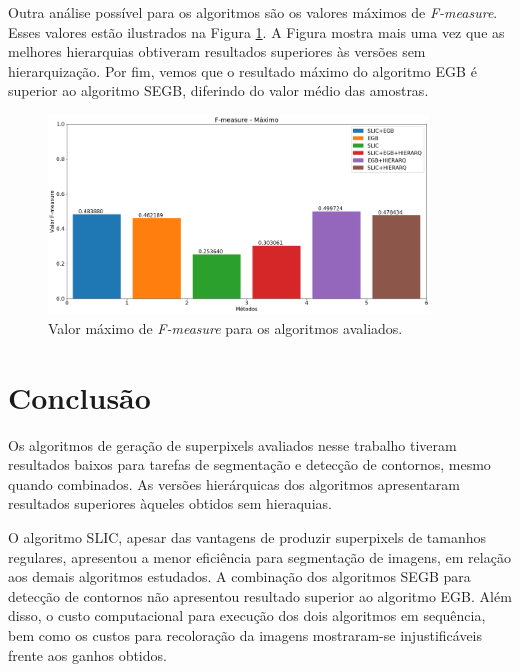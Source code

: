 \begin{document}
Outra análise possível para os algoritmos são os valores máximos de \textit{F-measure}. Esses valores estão ilustrados na Figura \ref{fig:FMEASURE_MAX}. A Figura mostra mais uma vez que as melhores hierarquias obtiveram resultados superiores às versões sem hierarquização. Por fim, vemos que o resultado máximo do algoritmo EGB é superior ao algoritmo SEGB, diferindo do valor médio das amostras.

\begin{figure}[ht]
\centering
\includegraphics[width=0.9\textwidth]{fmeasure_max.png}
\caption{Valor máximo de \textit{F-measure} para os algoritmos avaliados.}
\label{fig:FMEASURE_MAX}
\end{figure}



\section{Conclusão} \label{sec:conclusao}

Os algoritmos de geração de superpixels avaliados nesse trabalho tiveram resultados baixos para tarefas de segmentação e detecção de contornos, mesmo quando combinados. As versões hierárquicas dos algoritmos apresentaram resultados superiores àqueles obtidos sem hieraquias.

O algoritmo SLIC, apesar das vantagens de produzir superpixels de tamanhos regulares, apresentou a menor eficiência para segmentação de imagens, em relação aos demais algoritmos estudados. A combinação dos algoritmos SEGB para detecção de contornos não apresentou resultado   superior ao algoritmo EGB. Além disso, o custo computacional para execução dos dois algoritmos em sequência, bem como os custos para recoloração da imagens mostraram-se injustificáveis frente aos ganhos obtidos.
\end{document}
